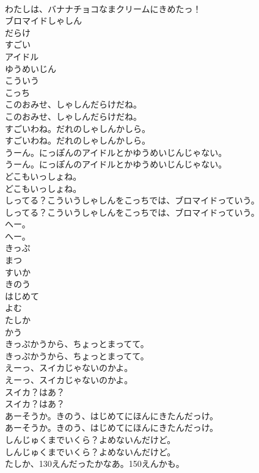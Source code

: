 \documentclass[8pt]{extreport}
\begin{document}
\begin{CJK}{UTF8}{min}
\\	わたしは、バナナチョコなまクリームにきめたっ！ 
\\	ブロマイドしゃしん
\\	だらけ
\\	すごい
\\	アイドル
\\	ゆうめいじん
\\	こういう
\\	こっち
\\	このおみせ、しゃしんだらけだね。	
\\	このおみせ、しゃしんだらけだね。 
\\	すごいわね。だれのしゃしんかしら。	
\\	すごいわね。だれのしゃしんかしら。 
\\	うーん。にっぽんのアイドルとかゆうめいじんじゃない。	
\\	うーん。にっぽんのアイドルとかゆうめいじんじゃない。 
\\	どこもいっしょね。	
\\	どこもいっしょね。 
\\	しってる？こういうしゃしんをこっちでは、ブロマイドっていう。	
\\	しってる？こういうしゃしんをこっちでは、ブロマイドっていう。 
\\	へー。	
\\	へー。 
\\	きっぷ
\\	まつ
\\	すいか
\\	きのう
\\	はじめて
\\	よむ
\\	たしか
\\	かう
\\	きっぷかうから、ちょっとまってて。	
\\	きっぷかうから、ちょっとまってて。 
\\	えーっ、スイカじゃないのかよ。	
\\	えーっ、スイカじゃないのかよ。 
\\	スイカ？はあ？	
\\	スイカ？はあ？ 
\\	あーそうか。きのう、はじめてにほんにきたんだっけ。	
\\	あーそうか。きのう、はじめてにほんにきたんだっけ。 
\\	しんじゅくまでいくら？よめないんだけど。	
\\	しんじゅくまでいくら？よめないんだけど。 
\\	たしか、130えんだったかなあ。150えんかも。	

\end{CJK}
\end{document}

